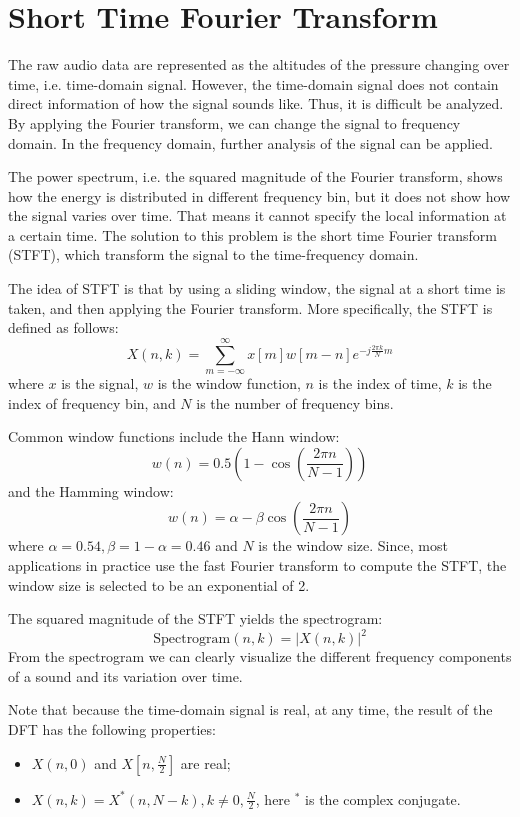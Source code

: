 \documentclass[12pt,final,twoside]{report}
\theoremstyle{plain}
\theoremstyle{definition}
\theoremstyle{remark}
\begin{document}
\section{Short Time Fourier Transform}
The raw audio data are represented as the altitudes of the pressure changing over time, i.e. time-domain signal. However, the time-domain signal does not contain direct information of how the signal sounds like. Thus, it is difficult be analyzed. By applying the Fourier transform, we can change the signal to frequency domain. In the frequency domain, further analysis of the signal can be applied.

The power spectrum, i.e. the squared magnitude of the Fourier transform, shows how the energy is distributed in different frequency bin, but it does not show how the signal varies over time. That means it cannot specify the local information at a certain time. The solution to this problem is the short time Fourier transform (STFT), which transform the signal to the time-frequency domain.

The idea of STFT is that by using a sliding window, the signal at a short time is taken, and then applying the Fourier transform. More specifically, the STFT is defined as follows:
\begin{equation}
  X(n, k) = \sum_{m = -\infty}^{\infty} x[m]w[m-n]e^{-j \frac{2\pi k}{N} m}
\end{equation}
where $x$ is the signal, $w$ is the window function, $n$ is the index of time, $k$ is the index of frequency bin, and $N$ is the number of frequency bins. 

Common window functions include the Hann window:
\begin{equation} w(n) = 0.5 (1 - \cos(\frac{2\pi n}{N-1})) \end{equation}
and the Hamming window:
\begin{equation} w(n) = \alpha - \beta \cos(\frac{2\pi n}{N-1}) \end{equation}
where $\alpha = 0.54, \beta = 1 - \alpha = 0.46$ and $N$ is the window size.
Since, most applications in practice use the fast Fourier transform to compute the STFT, the window size is selected to be an exponential of 2.

The squared magnitude of the STFT yields the spectrogram:
\[ \text{Spectrogram}(n, k) = \left|X(n,k)\right|^2 \]
From the spectrogram we can clearly visualize the different frequency components of a sound and its variation over time.

Note that because the time-domain signal is real, at any time, the result of the DFT has the following properties:
\begin{itemize}
  \item $X(n,0)$ and $X[n, \frac{N}{2}]$ are real;
  \item $X(n,k) = X^*(n,N-k), k \neq 0, \frac{N}{2}$, here $^*$ is the complex conjugate.
\end{itemize}
\end{document}
